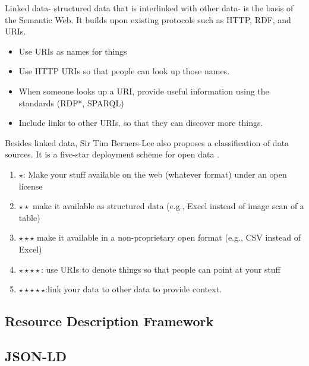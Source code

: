 Linked data- structured data that is interlinked with other data- is the basis of the Semantic Web. It builds upon existing protocols such as HTTP, RDF, and URIs.

\begin{itemize}
    \item Use URIs as names for things

    \item Use HTTP URIs so that people can look up those names.

    \item When someone looks up a URI, provide useful information using the standards (RDF*, SPARQL)

    \item Include links to other URIs. so that they can discover more things.

\end{itemize}

Besides linked data, Sir Tim Berners-Lee also proposes a classification of data sources. It is a five-star deployment scheme for open data \cite{noauthor_5-star_nodate}.

\begin{enumerate}
    \item $\star$: Make your stuff available on the web (whatever format) under an open license
    \item $\star\star$ make it available as structured data (e.g., Excel instead of image scan of a table)
    \item $\star\star\star$ make it available in a non-proprietary open format (e.g., CSV instead of Excel)
    \item $\star\star\star\star$: use URIs to denote things so that people can point at your stuff
    \item $\star\star\star\star\star$:link your data to other data to provide context.
\end{enumerate}

\subsection{Resource Description Framework}
\subsection{JSON-LD}

